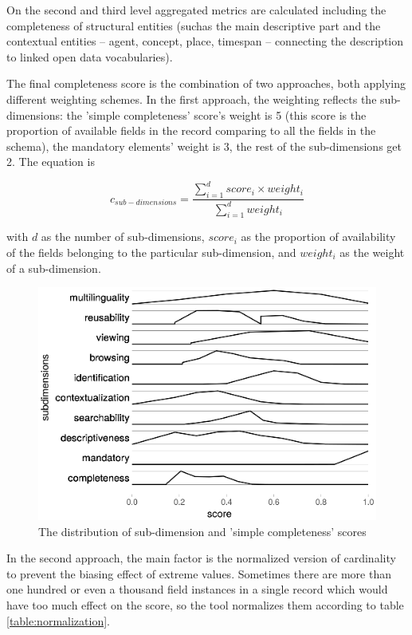 On the second and third level aggregated metrics are calculated including the completeness of structural entities (suchas the main descriptive part and the contextual entities -- agent, concept, place, timespan -- connecting the description to linked open data vocabularies).

The final completeness score is the combination of two approaches, both applying different weighting schemes. In the first approach, the weighting reflects the sub-dimensions: the 'simple completeness' score’s weight is 5 (this score is the proportion of available fields in the record comparing to all the fields in the schema), the mandatory elements’ weight is 3, the rest of the sub-dimensions get 2. The equation is

\begin{equation}
c_{sub-dimensions} = \frac{\sum\limits_{i=1}^{d} score_i \times weight_i}{\sum\limits_{i=1}^{d} weight_i}
\end{equation}

with $d$ as the number of sub-dimensions, $score_{i}$ as the proportion of availability of the fields belonging to the particular sub-dimension, and $weight_i$ as the weight of a sub-dimension.

\begin{figure}[ht]
\includegraphics[width=\textwidth]{images/chapter02/subdimensions.eps}
\centering
\caption{The distribution of sub-dimension and 'simple completeness' scores}
\label{figure:subdimensions}
\end{figure}

In the second approach, the main factor is the normalized version of cardinality to prevent the biasing effect of extreme values. Sometimes there are more than one hundred or even a thousand field instances in a single record which would have too much effect on the score, so the tool normalizes them according to table \ref{table:normalization}.

